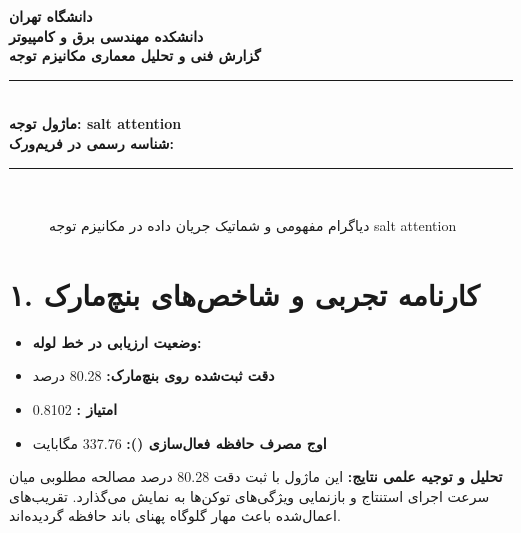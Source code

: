\documentclass[12pt,a4paper]{article}
\begin{document}
\begin{center}
{\Large\bfseries دانشگاه تهران}\\[0.2cm]
{\large\bfseries دانشکده مهندسی برق و کامپیوتر}\\[0.2cm]
{\large\bfseries گزارش فنی و تحلیل معماری مکانیزم توجه}\\[0.5cm]
\rule{\linewidth}{1pt}\\[0.3cm]
{\LARGE\bfseries ماژول توجه: salt attention}\\[0.2cm]
{\large \textbf{شناسه رسمی در فریم‌ورک:} }\\[0.2cm]
\rule{\linewidth}{1pt}\\[0.5cm]
\end{center}

\begin{figure}[H]
\centering
{}
\caption{دیاگرام مفهومی و شماتیک جریان داده در مکانیزم توجه salt attention}
\end{figure}

\section*{۱. کارنامه تجربی و شاخص‌های بنچ‌مارک}
\begin{itemize}
\item \textbf{وضعیت ارزیابی در خط لوله:} 
\item \textbf{دقت ثبت‌شده روی بنچ‌مارک:} 80.28 درصد
\item \textbf{امتیاز :} 0.8102
\item \textbf{اوج مصرف حافظه فعال‌سازی ():} 337.76 مگابایت
\end{itemize}
\textbf{تحلیل و توجیه علمی نتایج:} این ماژول با ثبت دقت 80.28 درصد مصالحه مطلوبی میان سرعت اجرای استنتاج و بازنمایی ویژگی‌های توکن‌ها به نمایش می‌گذارد. تقریب‌های اعمال‌شده باعث مهار گلوگاه پهنای باند حافظه گردیده‌اند.
\end{document}

